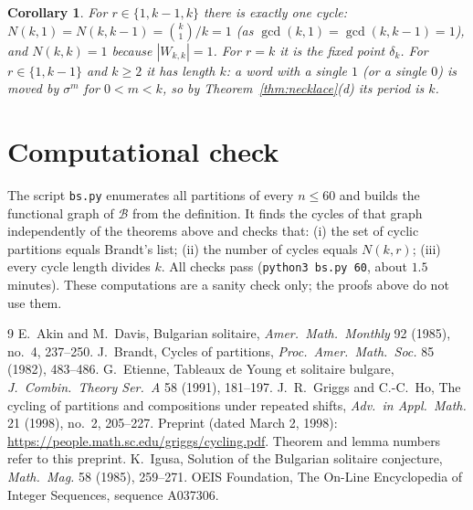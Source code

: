 \documentclass[11pt]{article}
\newtheorem{corollary}[theorem]{Corollary}
\theoremstyle{definition}
\newcommand{\B}{\mathcal{B}}
\renewcommand{\le}{\leqslant}
\renewcommand{\ge}{\geqslant}
\begin{document}
\begin{corollary}
For $r\in\{1,k-1,k\}$ there is exactly one cycle: $N(k,1)=N(k,k-1)=\binom k1/k=1$ (as $\gcd(k,1)=\gcd(k,k-1)=1$),
and $N(k,k)=1$ because $|W_{k,k}|=1$.  For $r=k$ it is the fixed point $\delta_k$.  For $r\in\{1,k-1\}$ and
$k\ge2$ it has length $k$: a word with a single $1$ (or a single $0$) is moved by $\sigma^m$ for $0<m<k$, so by
Theorem~\ref{thm:necklace}(d) its period is $k$.
\end{corollary}

\section{Computational check}
The script \texttt{bs.py} enumerates all partitions of every $n\le 60$ and builds the functional graph of
$\B$ from the definition.  It finds the cycles of that graph independently of the theorems above and
checks that: (i) the set of cyclic partitions equals Brandt's list; (ii) the number of cycles equals
$N(k,r)$; (iii) every cycle length divides $k$.  All checks pass (\texttt{python3 bs.py 60}, about $1.5$
minutes).  These computations are a sanity check only; the proofs above do not use them.

\begin{thebibliography}{9}
 E.~Akin and M.~Davis, Bulgarian solitaire, \emph{Amer.\ Math.\ Monthly} 92 (1985), no.~4, 237--250.
 J.~Brandt, Cycles of partitions, \emph{Proc.\ Amer.\ Math.\ Soc.} 85 (1982), 483--486.
 G.~Etienne, Tableaux de Young et solitaire bulgare, \emph{J.\ Combin.\ Theory Ser.~A} 58 (1991), 181--197.
 J.~R.~Griggs and C.-C.~Ho, The cycling of partitions and compositions under repeated shifts,
\emph{Adv.\ in Appl.\ Math.} 21 (1998), no.~2, 205--227. Preprint (dated March 2, 1998):
\url{https://people.math.sc.edu/griggs/cycling.pdf}. Theorem and lemma numbers refer to this preprint.
 K.~Igusa, Solution of the Bulgarian solitaire conjecture, \emph{Math.\ Mag.} 58 (1985), 259--271.
 OEIS Foundation, The On-Line Encyclopedia of Integer Sequences, sequence A037306.
\end{thebibliography}
\end{document}

